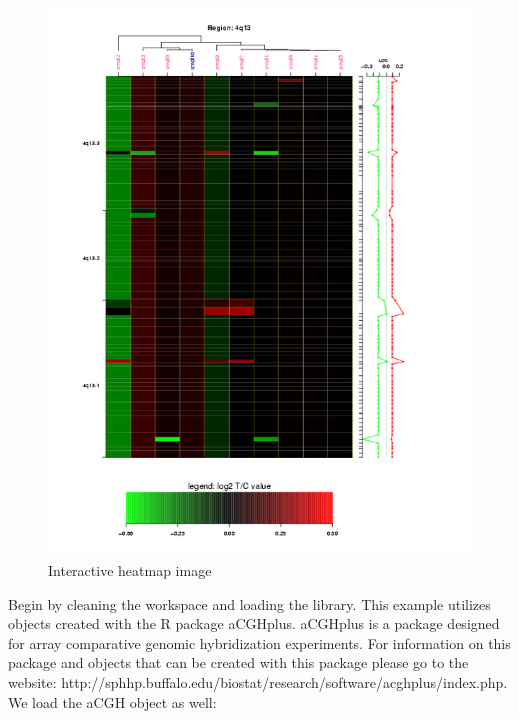 \documentclass[]{article}
\begin{document}
\begin{center}
\begin{figure}
\includegraphics{test}
\caption{Interactive heatmap image}
\end{figure}
\end{center}

Begin by cleaning the workspace and loading the library. This example utilizes objects created with the R package aCGHplus. aCGHplus is a package designed for array comparative genomic hybridization experiments. For information on this package and objects that can be created with this package please go to the website: http://sphhp.buffalo.edu/biostat/research/software/acghplus/index.php. We load the aCGH object as well:
\end{document}
